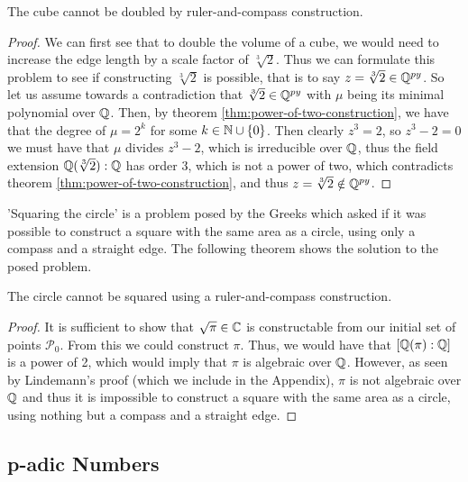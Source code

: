 \begin{theorem}
    The cube cannot be doubled by ruler-and-compass construction.
\end{theorem}

\begin{proof}  
    We can first see that to double the volume of a cube, we would need to increase the edge length by a scale factor of $\sqrt[3]{2}$. Thus we can formulate this problem to see if constructing $\sqrt[3]{2}$ is possible, that is to say $z = \sqrt[3]{2} \in \mathbb Q^{py}$.
\noindent
\newline
    So let us assume towards a contradiction that $\sqrt[3]{2} \in \mathbb Q^{py}$ with $\mu$ being its minimal polynomial over $\mathbb Q$. Then, by theorem \ref{thm:power-of-two-construction}, we have that the degree of $\mu = 2^k$ for some $k\in \mathbb N \cup \{0\}$.
\noindent
\newline
    Then clearly $z^3=2$, so $z^3-2=0$ we must have that $\mu$ divides $z^3-2$, which is irreducible over $\mathbb Q$, thus the field extension $\mathbb Q(\sqrt[3]{2}):\mathbb Q$ has order 3, which is not a power of two, which contradicts theorem \ref{thm:power-of-two-construction}, and thus $z = \sqrt[3]{2} \notin \mathbb Q^{py}$.

\end{proof}


'Squaring the circle' is a problem posed by the Greeks which asked if it was possible to construct a square with the same area as a circle, using only a compass and a straight edge. The following theorem shows the solution to the posed problem.

\begin{theorem}
    The circle cannot be squared using a ruler-and-compass construction.
\end{theorem}

\begin{proof}  
    
    It is sufficient to show that $\sqrt{\pi}\in \mathbb C$ is constructable from our initial set of points $\mathcal{P}_0$. From this we could construct $\pi$. Thus, we would have that $[\mathbb Q(\pi):\mathbb Q]$ is a power of 2, which would imply that $\pi$ is algebraic over $\mathbb Q$. However, as seen by Lindemann's proof (which we include in the Appendix), $\pi$ is not algebraic over $\mathbb Q$ and thus it is impossible to construct a square with the same area as a circle, using nothing but a compass and a straight edge.
\end{proof}

\subsection{p-adic Numbers}